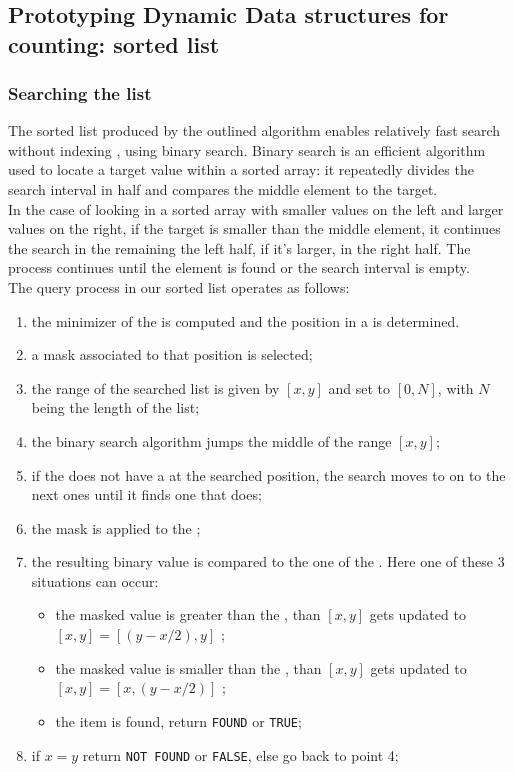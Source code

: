 \chapter{}
\section*{Prototyping Dynamic Data structures for \kmer counting: \skmer sorted list}
\label{skmer_appendix}
\subsection*{Searching the list}
The sorted \skmer list produced by the outlined algorithm enables relatively fast search without indexing \kmers, using binary search. Binary search is an efficient algorithm used to locate a target value within a sorted array: it repeatedly divides the search interval in half and compares the middle element to the target.\\
In the case of looking in a sorted array with smaller values on the left and larger values on the right, if the target is smaller than the middle element, it continues the search in the remaining the left half, if it's larger, in the right half. The process continues until the element is found or the search interval is empty.\\
The \kmer query process in our sorted \skmer list operates as follows:
\begin{enumerate}
	\item the minimizer of the \kmers is computed and the \kmer position in a \skmer is determined.
	\item a mask associated to that position is selected;
	\item the range of the searched list is given by $[x,y]$ and set to $[0,N]$, with $N$ being the length of the list;
	\item the binary search algorithm jumps the middle \skmer of the range $[x,y]$;
	\item if the \skmer does not have a \kmer at the searched position, the search moves to on to the next ones until it finds one that does;
	\item the mask is applied to the \skmer;
	\item the resulting binary value is compared to the one of the \kmer. Here one of these 3 situations can occur:
	\begin{itemize}
		\item the masked \skmer value is greater than the \kmer, than $[x,y]$ gets updated to $[x,y] = [(y-x/2),y]$ ;
		\item the masked \skmer value is smaller than the \kmer, than $[x,y]$ gets updated to $[x,y] = [x,(y-x/2)]$ ;
		\item the item is found, return \texttt{FOUND} or \texttt{TRUE};
	\end{itemize}
	\item if $x = y$ return \texttt{NOT FOUND} or \texttt{FALSE}, else go back to point 4;
\end{enumerate}
